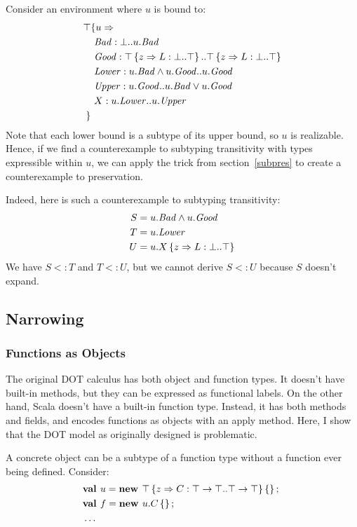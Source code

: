 \documentclass[preprint,9pt]{sigplanconf}
\begin{document}
Consider an environment where $u$ is bound to:
\begin{align*}
\top & \{u \Rightarrow \\
&\ \mathit{Bad} : \bot..u.\mathit{Bad}\\
&\ \mathit{Good} : \top \left\{z \Rightarrow L : \bot..\top \right\}..\top \left\{z \Rightarrow L : \bot..\top \right\}\\
&\ \mathit{Lower} : u.\mathit{Bad} \wedge u.\mathit{Good}..u.\mathit{Good}\\
&\ \mathit{Upper} : u.\mathit{Good}..u.\mathit{Bad} \vee u.\mathit{Good}\\
&\ X : u.\mathit{Lower}..u.\mathit{Upper}\\
 \}&
\end{align*}
Note that each lower bound is a subtype of its upper bound, so $u$ is
realizable. Hence, if we find a counterexample to subtyping
transitivity with types expressible within $u$, we can apply the trick
from section~\ref{subpres} to create a counterexample to preservation.

Indeed, here is such a counterexample to subtyping transitivity:
\begin{align*}
S &= u.\mathit{Bad} \wedge u.\mathit{Good}\\
T &= u.\mathit{Lower}\\
U &= u.X \left\{z \Rightarrow L : \bot..\top \right\}
\end{align*}
We have $S <: T$ and $T <: U$, but we cannot derive $S <: U$ because
$S$ doesn't expand.

\subsection{Narrowing}\label{narrowing}

\subsubsection{Functions as Objects}\label{fun}

The original DOT calculus has both object and function types. It
doesn't have built-in methods, but they can be expressed as functional
labels. On the other hand, Scala doesn't have a built-in function
type. Instead, it has both methods and fields, and encodes functions
as objects with an apply method. Here, I show that the DOT model as
originally designed is problematic.

A concrete object can be a subtype of a function type without a
function ever being defined. Consider:
\begin{align*}
&\mlnew u {\Top \refine z {\Ldecl C {\Top \tfun \Top} {\Top \tfun \Top}} \ldefs{}} {
\mlnew f {u.C \ldefs{}} {
\ldots
}}
\end{align*}
\end{document}
